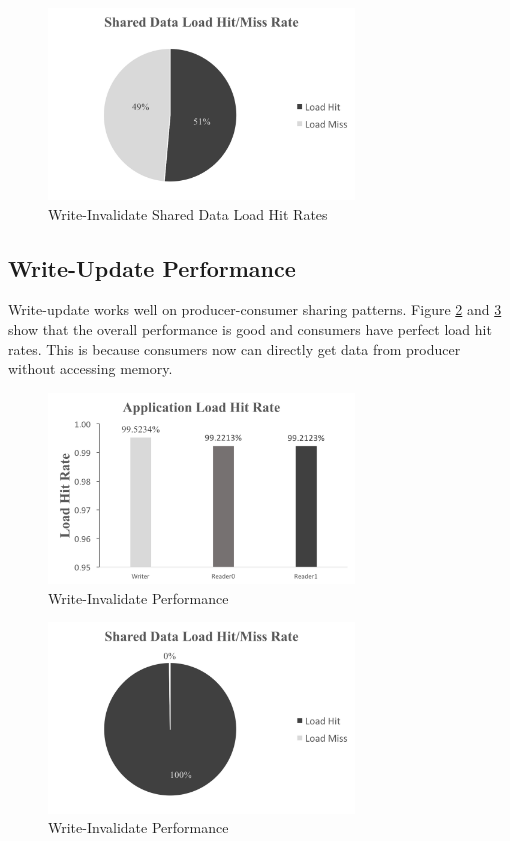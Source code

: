 \documentclass[11pt,conference]{IEEEtran}
\begin{document}
\begin{figure}[!h]
\centering
\includegraphics[width=3.2in]{write_invalidate_1.png}
\caption{Write-Invalidate Shared Data Load Hit Rates}
\label{write_invalidate_1}
\end{figure}
\FloatBarrier


\subsection{Write-Update Performance}
Write-update works well on producer-consumer sharing patterns. Figure \ref{write_update} and \ref{write_update_1} show that the overall performance is good and consumers have perfect load hit rates. This is because consumers now can directly get data from producer without accessing memory.

\begin{figure}[!h]
\centering
\includegraphics[width=3.2in]{write_update.png}
\caption{Write-Invalidate Performance}
\label{write_update}
\end{figure}
\FloatBarrier

\begin{figure}[!h]
\centering
\includegraphics[width=3.2in]{write_update_1.png}
\caption{Write-Invalidate Performance}
\label{write_update_1}
\end{figure}
\FloatBarrier
\end{document}
